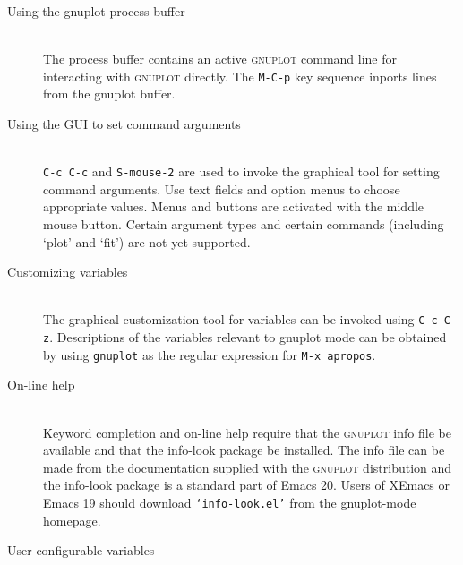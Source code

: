 \documentclass[twocolumn]{article}
\newenvironment{Boxedminipage}%
{\begin{Sbox}\begin{minipage}}%
  {\end{minipage}\end{Sbox}\Ovalbox{\TheSbox}}
\def\file#1{{\texttt{`#1'}}}
\begin{document}
\vspace{4ex}

\begin{description}
\item[Using the gnuplot-process buffer] \hfill \\
  The process buffer contains an active \textsc{gnuplot} command line
  for interacting with \textsc{gnuplot} directly.  The \texttt{M-C-p}
  key sequence inports lines from the gnuplot buffer.
\item[Using the GUI to set command arguments] \hfill \\
  \texttt{C-c C-c} and \texttt{S-mouse-2} are used to invoke the
  graphical tool for setting command arguments.  Use text fields and
  option menus to choose appropriate values.  Menus and buttons are
  activated with the middle mouse button.  Certain argument types and
  certain commands (including `plot' and `fit') are not yet supported.
\item[Customizing variables] \hfill \\
  The graphical customization tool for variables can be invoked using
  \texttt{C-c C-z}.  Descriptions of the variables relevant to gnuplot
  mode can be obtained by using \texttt{gnuplot} as the regular
  expression for \texttt{M-x apropos}.
\item[On-line help] \hfill \\
  Keyword completion and on-line help require that the
  \textsc{gnuplot} info file be available and that the info-look
  package be installed.  The info file can be made from the
  documentation supplied with the \textsc{gnuplot} distribution and
  the info-look package is a standard part of Emacs 20.  Users of
  XEmacs or Emacs 19 should download \file{info-look.el} from the
  gnuplot-mode homepage.
\end{description}



\vfill
\pagebreak


\begin{center}
  \begin{Boxedminipage}{0.75\linewidth}
    \begin{center}
      {\large User configurable variables}
    \end{center}
  \end{Boxedminipage}
\end{center}
\end{document}
